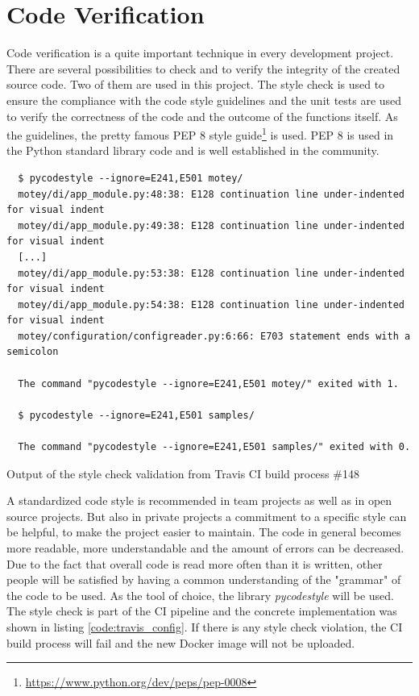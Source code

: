 \section{Code Verification}
\label{section:code-verification}
Code verification is a quite important technique in every development project.
There are several possibilities to check and to verify the integrity of the created source code.
Two of them are used in this project.
The style check is used to ensure the compliance with the code style guidelines and the unit tests are used to verify the correctness of the code and the outcome of the functions itself.
As the guidelines, the pretty famous \ac{PEP} 8 style guide\footnote{\url{https://www.python.org/dev/peps/pep-0008}} is used.
\ac{PEP} 8 is used in the Python standard library code and is well established in the community.\newline

\begin{listing}[H]
  \begin{verbatim}
  $ pycodestyle --ignore=E241,E501 motey/
  motey/di/app_module.py:48:38: E128 continuation line under-indented for visual indent
  motey/di/app_module.py:49:38: E128 continuation line under-indented for visual indent
  [...]
  motey/di/app_module.py:53:38: E128 continuation line under-indented for visual indent
  motey/di/app_module.py:54:38: E128 continuation line under-indented for visual indent
  motey/configuration/configreader.py:6:66: E703 statement ends with a semicolon

  The command "pycodestyle --ignore=E241,E501 motey/" exited with 1.

  $ pycodestyle --ignore=E241,E501 samples/

  The command "pycodestyle --ignore=E241,E501 samples/" exited with 0.
  \end{verbatim}
  \caption[Output of the style check validation from Travis CI build process \#148]{Output of the style check validation from Travis CI build process \#148\autocite{Travis:Build:148}}
  \label{code:style_check_validation}
\end{listing}

A standardized code style is recommended in team projects as well as in open source projects.
But also in private projects a commitment to a specific style can be helpful, to make the project easier to maintain.
The code in general becomes more readable, more understandable and the amount of errors can be decreased.
Due to the fact that overall code is read more often than it is written, other people will be satisfied by having a common understanding of the "grammar" of the code to be used.
As the tool of choice, the library \textit{pycodestyle} will be used.
The style check is part of the \ac{CI} pipeline and the concrete implementation was shown in listing \ref{code:travis_config}.
If there is any style check violation, the \ac{CI} build process will fail and the new Docker image will not be uploaded.\newline

